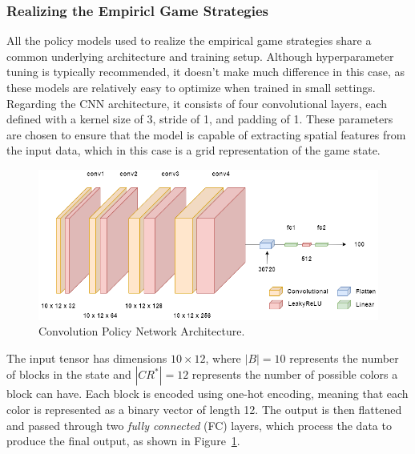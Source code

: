     \subsubsection{Realizing the Empiricl Game Strategies}

        All the policy models used to realize the empirical game strategies share a common underlying architecture and training setup. Although hyperparameter tuning is typically recommended, it doesn't make much difference in this case, as these models are relatively easy to optimize when trained in small settings. Regarding the CNN architecture, it consists of four convolutional layers, each defined with a kernel size of 3, stride of 1, and padding of 1. These parameters are chosen to ensure that the model is capable of extracting spatial features from the input data, which in this case is a grid representation of the game state. 
        \begin{figure}[H]
            \centering
            \includegraphics[width=0.8\linewidth]{images/convDQN.png}
            \caption{Convolution Policy Network Architecture.}
            \label{fig:convDQN}
        \end{figure}
        
        \noindent
        The input tensor has dimensions $10 \times 12$, where $|B|=10$ represents the number of blocks in the state and $|CR^*|=12$ represents the number of possible colors a block can have. Each block is encoded using one-hot encoding, meaning that each color is represented as a binary vector of length 12. The output is then flattened and passed through two \emph{fully connected} (FC) layers, which process the data to produce the final output, as shown in Figure~\ref{fig:convDQN}.\tinydouble

